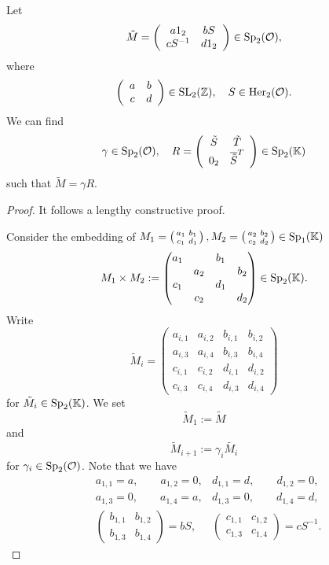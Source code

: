 \begin{lemma}[$solveR$]
\label{lemma:solveR}
\label{solveR}
\label{impl:solveR}
Let
\[ \tilde{M} = \left( \begin{array}{cc} a 1_2 & b S \\ c S^{-1} & d 1_2 \end{array} \right) \in \operatorname{Sp}_2(\mathcal{O}) , \]
where
\[ \left( \begin{array}{cc} a & b \\ c & d \end{array} \right) \in \operatorname{SL}_2(\mathbb{Z}), \quad S \in \operatorname{Her}_2(\mathcal{O}) . \]
We can find
\[ \gamma \in \operatorname{Sp}_2(\mathcal{O}), \quad R = \left( \begin{array}{cc} \tilde{S} & \tilde{T} \\ 0_2 & \overline{\tilde{S}}^T \end{array} \right) \in \operatorname{Sp}_2(\mathbb{K}) \]
such that $\tilde{M} = \gamma R$.
\begin{proof}
It follows a lengthy constructive proof.

Consider the embedding of $M_1 = \left( \begin{smallmatrix} a_1 & b_1 \\ c_1 & d_1 \end{smallmatrix} \right), M_2 = \left( \begin{smallmatrix} a_2 & b_2 \\ c_2 & d_2 \end{smallmatrix} \right) \in \operatorname{Sp}_1(\mathbb{K})$
\[ M_1 \times M_2 := \begin{pmatrix}
a_1 & & b_1 & \\
& a_2 & & b_2 \\
c_1 & & d_1 & \\
& c_2 & & d_2
\end{pmatrix} \in \operatorname{Sp}_2(\mathbb{K}). \]
Write
\[ \tilde{M}_i = \begin{pmatrix}
a_{i,1} & a_{i,2} & b_{i,1} & b_{i,2} \\
a_{i,3} & a_{i,4} & b_{i,3} & b_{i,4} \\
c_{i,1} & c_{i,2} & d_{i,1} & d_{i,2} \\
c_{i,3} & c_{i,4} & d_{i,3} & d_{i,4}
\end{pmatrix} \]
for $\tilde{M}_i \in \operatorname{Sp}_2(\mathbb{K})$.
We set
\[ \tilde{M}_1 := \tilde{M} \]
and
\[ \tilde{M}_{i+1} := \gamma_i \tilde{M_i} \]
for $\gamma_i \in \operatorname{Sp}_2(\mathcal{O})$.
Note that we have
\begin{align*}
&a_{1,1} = a, \quad \quad a_{1,2} = 0,
&d_{1,1} = d, \quad \quad d_{1,2} = 0, \\
&a_{1,3} = 0, \quad \quad a_{1,4} = a,
&d_{1,3} = 0, \quad \quad d_{1,4} = d, \\
&\begin{pmatrix}
b_{1,1} & b_{1,2} \\
b_{1,3} & b_{1,4}
\end{pmatrix} = bS ,
& \begin{pmatrix}
c_{1,1} & c_{1,2} \\
c_{1,3} & c_{1,4}
\end{pmatrix} = cS^{-1} .
\end{align*}


\end{proof}
\end{lemma}
